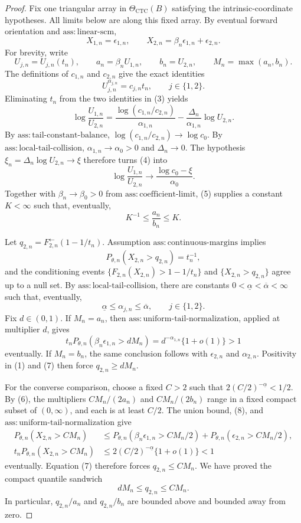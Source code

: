 \documentclass{article}
\begin{document}
\begin{proof}
Fix one triangular array in \(\Theta_{\mathrm{CTC}}(B)\) satisfying the intrinsic-coordinate hypotheses. All limits below are along this fixed array. By eventual forward orientation and \(\mathrm{ass{:}linear\text{-}scm}\),
\[
X_{1,n}=\epsilon_{1,n},
\qquad
X_{2,n}=\beta_n\epsilon_{1,n}+\epsilon_{2,n}.
\tag{1}
\]
For brevity, write
\[
U_{j,n}=U_{j,n}(t_n),
\qquad
a_n=\beta_nU_{1,n},
\qquad
b_n=U_{2,n},
\qquad
M_n=\max(a_n,b_n).
\tag{2}
\]
The definitions of \(c_{1,n}\) and \(c_{2,n}\) give the exact identities
\[
U_{j,n}^{\alpha_{j,n}}=c_{j,n}t_n,
\qquad j\in\{1,2\}.
\tag{3}
\]
Eliminating \(t_n\) from the two identities in (3) yields
\[
\log\frac{U_{1,n}}{U_{2,n}}
=\frac{\log(c_{1,n}/c_{2,n})}{\alpha_{1,n}}
-\frac{\Delta_n}{\alpha_{1,n}}\log U_{2,n}.
\tag{4}
\]
By \(\mathrm{ass{:}tail\text{-}constant\text{-}balance}\), \(\log(c_{1,n}/c_{2,n})\to\log c_0\). By \(\mathrm{ass{:}local\text{-}tail\text{-}collision}\), \(\alpha_{1,n}\to\alpha_0>0\) and \(\Delta_n\to0\). The hypothesis \(\xi_n=\Delta_n\log U_{2,n}\to\xi\) therefore turns (4) into
\[
\log\frac{U_{1,n}}{U_{2,n}}
\longrightarrow \frac{\log c_0-\xi}{\alpha_0}.
\tag{5}
\]
Together with \(\beta_n\to\beta_0>0\) from \(\mathrm{ass{:}coefficient\text{-}limit}\), (5) supplies a constant \(K<\infty\) such that, eventually,
\[
K^{-1}\leq\frac{a_n}{b_n}\leq K.
\tag{6}
\]

Let \(q_{2,n}=F_{2,n}^{\leftarrow}(1-1/t_n)\). Assumption \(\mathrm{ass{:}continuous\text{-}margins}\) implies
\[
P_{\theta,n}(X_{2,n}>q_{2,n})=t_n^{-1},
\tag{7}
\]
and the conditioning events \(\{F_{2,n}(X_{2,n})>1-1/t_n\}\) and \(\{X_{2,n}>q_{2,n}\}\) agree up to a null set. By \(\mathrm{ass{:}local\text{-}tail\text{-}collision}\), there are constants \(0<\underline\alpha<\overline\alpha<\infty\) such that, eventually,
\[
\underline\alpha\leq\alpha_{j,n}\leq\overline\alpha,
\qquad j\in\{1,2\}.
\tag{8}
\]
Fix \(d\in(0,1)\). If \(M_n=a_n\), then \(\mathrm{ass{:}uniform\text{-}tail\text{-}normalization}\), applied at multiplier \(d\), gives
\[
t_nP_{\theta,n}(\beta_n\epsilon_{1,n}>dM_n)
=d^{-\alpha_{1,n}}\{1+o(1)\}>1
\tag{9}
\]
eventually. If \(M_n=b_n\), the same conclusion follows with \(\epsilon_{2,n}\) and \(\alpha_{2,n}\). Positivity in (1) and (7) then force \(q_{2,n}\geq dM_n\).

For the converse comparison, choose a fixed \(C>2\) such that \(2(C/2)^{-\underline\alpha}<1/2\). By (6), the multipliers \(CM_n/(2a_n)\) and \(CM_n/(2b_n)\) range in a fixed compact subset of \((0,\infty)\), and each is at least \(C/2\). The union bound, (8), and \(\mathrm{ass{:}uniform\text{-}tail\text{-}normalization}\) give
\[
\begin{aligned}
P_{\theta,n}(X_{2,n}>CM_n)
&\leq P_{\theta,n}(\beta_n\epsilon_{1,n}>CM_n/2)
+P_{\theta,n}(\epsilon_{2,n}>CM_n/2),\\
t_nP_{\theta,n}(X_{2,n}>CM_n)
&\leq 2(C/2)^{-\underline\alpha}\{1+o(1)\}<1
\end{aligned}
\tag{10}
\]
eventually. Equation (7) therefore forces \(q_{2,n}\leq CM_n\). We have proved the compact quantile sandwich
\[
dM_n\leq q_{2,n}\leq CM_n.
\tag{11}
\]
In particular, \(q_{2,n}/a_n\) and \(q_{2,n}/b_n\) are bounded above and bounded away from zero.


\end{proof}
\end{document}
